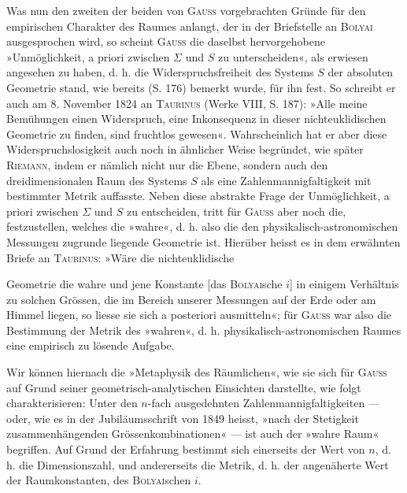 Was nun den zweiten der beiden von \textsc{Gauss} vorgebrachten Gründe für
den empirischen Charakter des Raumes anlangt, der in der Briefstelle an
\textsc{Bolyai} ausgesprochen wird, so scheint \textsc{Gauss} die daselbst hervorgehobene
»Unmöglichkeit, a priori zwischen \(\Sigma\) und \(S\) zu unterscheiden«, als erwiesen
angesehen zu haben, d. h. die Widerspruchsfreiheit des Systems \(S\) der absoluten
Geometrie stand, wie bereits (S. 176) bemerkt wurde, für ihn fest. So
schreibt er auch am 8. November 1824 an \textsc{Taurinus} (Werke VIII, S. 187): »Alle
meine Bemühungen einen Widerspruch, eine Inkonsequenz in dieser nichteuklidischen
Geometrie zu finden, sind fruchtlos gewesen«. Wahrscheinlich
hat er aber diese Widerspruchslosigkeit auch noch in ähnlicher Weise begründet,
wie später \textsc{Riemann}, indem er nämlich nicht nur die Ebene, sondern
auch den dreidimensionalen Raum des Systems \(S\) als eine Zahlenmannigfaltigkeit
mit bestimmter Metrik auffasste. Neben diese abstrakte Frage der Unmöglichkeit,
a priori zwischen \(\Sigma\) und \(S\) zu entscheiden, tritt für \textsc{Gauss} aber
noch die, festzustellen, welches die »wahre«, d. h. also die den physikalisch-astronomischen
Messungen zugrunde liegende Geometrie ist. Hierüber heisst
es in dem erwähnten Briefe an \textsc{Taurinus}: »Wäre die nichteuklidische
\par\clearpage{}
\noindent Geometrie die wahre und jene Konstante [das \textsc{Bolyai}sche \(i\)] in einigem Verhältnis
zu solchen Grössen, die im Bereich unserer Messungen auf der Erde oder am
Himmel liegen, so liesse sie sich a posteriori ausmitteln«; für \textsc{Gauss} war also
die Bestimmung der Metrik des »wahren«, d. h. physikalisch-astronomischen
Raumes eine empirisch zu lösende Aufgabe.

Wir können hiernach die »Metaphysik des Räumlichen«, wie sie sich für
\textsc{Gauss} auf Grund seiner geometrisch-analytischen Einsichten darstellte, wie
folgt charakterisieren: Unter den \(n\)-fach ausgedehnten Zahlenmannigfaltigkeiten
— oder, wie es in der Jubiläumsschrift von 1849 heisst, »nach der Stetigkeit
zusammenhängenden Grössenkombinationen« — ist auch der »wahre Raum«
begriffen. Auf Grund der Erfahrung bestimmt sich einerseits der Wert von
\(n\), d. h. die Dimensionszahl, und andererseits die Metrik, d. h. der angenäherte
Wert der Raumkonstanten, des \textsc{Bolyai}schen \(i\).

